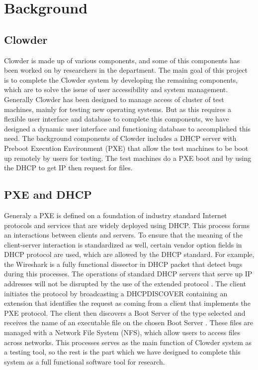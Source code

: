 \chapter{Background}
\label{chap:figtab}
\label{chap}
\section{Clowder}
Clowder is made up of various components, and some of this components has been worked on by researchers in the department. The main goal of this project is to complete the Clowder system by developing the remaining components, which are to solve the issue of user accessibility and system management. Generally Clowder has been designed to manage access of cluster of test machines, mainly for testing new operating systems. But as this requires a flexible user interface and database to complete this components, we have designed a dynamic user interface and functioning database to accomplished this need. The background components of Clowder includes  a  DHCP server with Preboot Execution Environment (PXE)  that allow the test machines to be boot up remotely by users for testing. The test machines do a PXE boot and by using the DHCP to get IP then request for files. 
\section{PXE and DHCP}
Generaly a PXE is defined on a foundation of industry standard Internet protocols and services that are widely deployed using DHCP. This process forms an interactions between clients and servers. To ensure that the meaning of the client-server interaction is standardized as well, certain vendor option fields in DHCP protocol are used, which are allowed by the DHCP standard. For example, the Wireshark is a fully functional dissector in DHCP packet that detect bugs during this processes\cite{DHCP}. The operations of standard DHCP servers that serve up IP addresses will not be disrupted by the use of the extended protocol \cite{PXE}.
The client initiates the protocol by broadcasting a DHCPDISCOVER containing an extension that identifies the request as coming from a client that implements the PXE protocol. The client then discovers a Boot Server of the type selected and receives the name of an executable file on the chosen Boot Server \cite{PXE}. These files are managed with a Network File System (NFS), which allow users to access files across networks. This processes serves as the main function of Clowder system as a testing tool, so the rest is the part which we have designed to complete this system as a full functional software tool for research.
